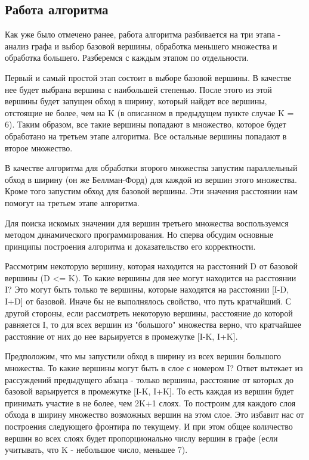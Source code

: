 \FloatBarrier
\subsection{Работа алгоритма}
Как уже было отмечено ранее, работа алгоритма разбивается на три этапа - анализ графа и выбор базовой вершины, обработка меньшего множества и обработка большего. Разберемся с каждым этапом по отдельности.

Первый и самый простой этап состоит в выборе базовой вершины. В качестве нее будет выбрана вершина с наибольшей степенью. После этого из этой вершины будет запущен обход в ширину, который найдет все вершины, отстоящие не более, чем на K (в описанном в предыдущем пункте случае K = 6). Таким образом, все такие вершины попадают в множество, которое будет обработано на третьем этапе алгоритма. Все остальные вершины попадают в второе множество.



В качестве алгоритма для обработки второго множества запустим параллельный обход в ширину (он же Беллман-Форд) для каждой из вершин этого множества. Кроме того запустим обход для базовой вершины. Эти значения расстоянии нам помогут на третьем этапе алгоритма.

Для поиска искомых значении для вершин третьего множества воспользуемся методом динамического программирования. Но сперва обсудим основные принципы построения алгоритма и доказательство его корректности. 

Рассмотрим некоторую вершину, которая находится на расстояний D от базовой вершины (D <= K). То какие вершины для нее могут находится на расстоянии I? Это могут быть только те вершины, которые находятся на расстоянии [I-D, I+D] от базовой. Иначе бы не выполнялось свойство, что путь кратчайший. С другой стороны, если рассмотреть некоторую вершины, расстояние до которой равняется I, то для всех вершин из "большого" множества верно, что кратчайшее расстояние от них до нее варьируется в промежутке [I-K, I+K]. 

 Предположим, что мы запустили обход в ширину из всех вершин большого множества. То какие вершины могут быть в слое с номером I? Ответ вытекает из рассуждений предыдущего абзаца - только вершины, расстояние от которых до базовой варьируется в промежутке [I-K, I+K]. То есть каждая из вершин будет принимать участие в не более, чем 2K+1 слоях. То построим для каждого слоя обхода в ширину множество возможных вершин на этом слое. Это избавит нас от построения следующего фронтира по текущему. И при этом общее количество вершин во всех слоях будет пропорционально числу вершин в графе (если учитывать, что K - небольшое число, меньшее 7). 
 
